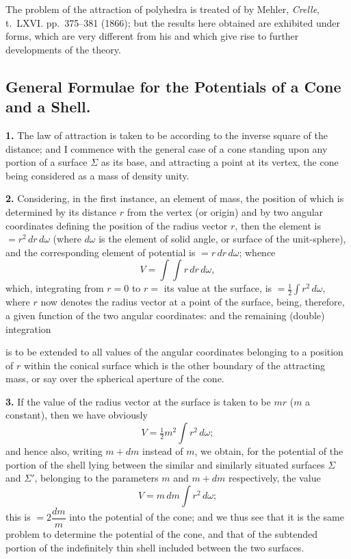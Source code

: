 \documentclass[11pt,a4paper]{article}
\begin{document}
The problem of the attraction of polyhedra is treated of by Mehler,
\textit{Crelle}, t.~LXVI. pp.~375--381 (1866); but the results here obtained
are exhibited under forms, which are very different from his and which give
rise to further developments of the theory.

\subsection*{General Formulae for the Potentials of a Cone and a Shell.}

\smallskip\noindent\textbf{1.}\quad
The law of attraction is taken to be according to the inverse square of the
distance; and I commence with the general case of a cone standing upon any
portion of a surface $\Sigma$ as its base, and attracting a point at its
vertex, the cone being considered as a mass of density unity.

\smallskip\noindent\textbf{2.}\quad
Considering, in the first instance, an element of mass, the position of which
is determined by its distance $r$ from the vertex (or origin) and by two
angular coordinates defining the position of the radius vector $r$, then the
element is $=r^2\,dr\,d\omega$ (where $d\omega$ is the element of solid
angle, or surface of the unit-sphere), and the corresponding element of
potential is $=r\,dr\,d\omega$; whence
\[
V = \int\!\!\int r\,dr\,d\omega,
\]
which, integrating from $r=0$ to $r=$ its value at the surface, is
$=\tfrac{1}{2}\int r^2\,d\omega$, where $r$ now denotes the radius vector at a
point of the surface, being, therefore, a given function of the two angular
coordinates: and the remaining (double) integration

\newpage
\noindent is to be extended to all values of the angular coordinates belonging to a
position of $r$ within the conical surface which is the other boundary of the
attracting mass, or say over the spherical aperture of the cone.

\smallskip\noindent\textbf{3.}\quad
If the value of the radius vector at the surface is taken to be $mr$ ($m$ a
constant), then we have obviously
\[
V = \tfrac{1}{2}m^2 \int r^2\,d\omega;
\]
and hence also, writing $m+dm$ instead of $m$, we obtain, for the potential
of the portion of the shell lying between the similar and similarly situated
surfaces $\Sigma$ and $\Sigma'$, belonging to the parameters $m$ and $m+dm$
respectively, the value
\[
V = m\,dm \int r^2\,d\omega;
\]
this is $=2\dfrac{dm}{m}$ into the potential of the cone; and we thus see that
it is the same problem to determine the potential of the cone, and that of
the subtended portion of the indefinitely thin shell included between the two
surfaces.
\end{document}

